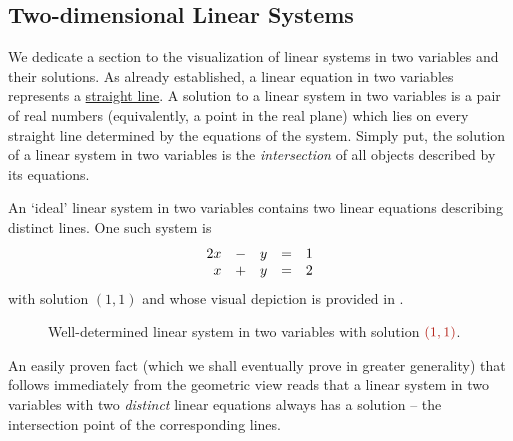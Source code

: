 \subsection{Two-dimensional Linear Systems}
\label{ssec:two-dimensional-linear-systems}

We dedicate a section to the visualization of linear systems in two variables
and their solutions. As already established, a linear equation in two variables
represents a \hyperref[def:straight-line]{straight line}. A solution to a linear
system in two variables is a pair of real numbers (equivalently, a point in the
real plane) which lies on every straight line determined by the equations of the
system. Simply put, the solution of a linear system in two variables is the
\emph{intersection} of all objects described by its equations.

An `ideal' linear system in two variables contains two linear equations
describing distinct lines. One such system is
\[
 \begin{array}{r c r c r}
  2x & - & y & = & 1\\
  x & + & y & = & 2
 \end{array}
\]
with solution $(1,1)$ and whose visual depiction is provided in
.

\begin{figure}[ht]
 \centering

 \caption{Well-determined linear system in two variables with solution
 $\clr{(1,1)}$.}
 \label{fig:well-determined-system}
\end{figure}

An easily proven fact (which we shall eventually prove in greater generality)
that follows immediately from the geometric view reads that a linear system in
two variables with two \emph{distinct} linear equations always has a solution --
the intersection point of the corresponding lines.

